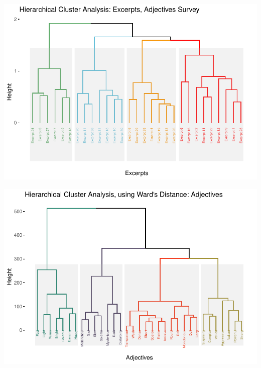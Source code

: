 \documentclass[
]{article}
\begin{document}
\begin{center}\includegraphics{MusDes_Supplementary_files/figure-latex/HCA.adj-1} \end{center}

\begin{center}\includegraphics{MusDes_Supplementary_files/figure-latex/HCA4words-1} \end{center}
\end{document}
